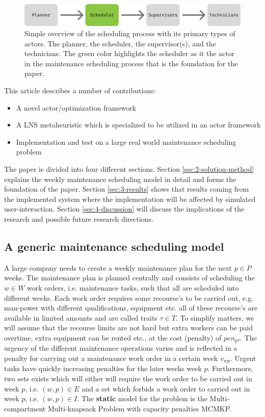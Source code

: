 \documentclass[preprint,12pt,authoryear]{elsarticle}
\begin{document}
\begin{figure}
\includegraphics[width=1.0\textwidth]{figures/Scheduling Process Simple.png}
\caption{Simple overview of the scheduling process with its primary types of actors. The planner, the scheduler, the supervisor(s), and the technicians. The green color highlights the scheduler as it the actor in the maintenance scheduling process that is the foundation for the paper.}
\label{fig:simple-maintenance-process}
\end{figure}

This article describes a number of contributions: 

\begin{itemize}
\item A novel actor/optimization framework
\item A LNS metaheuristic which is specialized to be utilized in an actor framework
\item Implementation and test on a large real world maintenance scheduling problem
\end{itemize}

The paper is divided into four different sections. Section \ref{sec:2-solution-method} explains the weekly maintenance scheduling model in detail and forms the foundation of the paper. Section \ref{sec:3-results} shows that results coming from the implemented system where the implementation will be affected by simulated user-interaction. Section \ref{sec:4-discussion} will discuss the implications of the research and possible future research directions.

\subsection{A generic maintenance scheduling model}
\label{sub2sec2}
A large company needs to create a weekly maintenance plan for the next $p \in P$ weeks. The maintenance plan is planned centrally and consists of scheduling the $w \in W$ work orders, i.e. maintenance tasks, such that all are scheduled into different weeks. Each work order requires some recourse's to be carried out, e.g. man-power with different qualifications, equipment etc. all of these recourse's are available in limited amounts and are called traits $\tau \in T$. To simplify matters, we will assume that the recourse limits are not hard but extra workers can be paid overtime, extra equipment can be rented etc., at the cost (penalty) of $pen_{p\tau}$. The urgency of the different maintenance operations varies and is reflected in a penalty for carrying out a maintenance work order in a certain week $v_{wp}$. Urgent tasks have quickly increasing penalties for the later weeks week $p$. Furthermore, two sets exists which will either will require the work order to be carried out in week $p$, i.e. $(w,p) \in E$ and a set which forbids a work order to carried out in week $p$, i.e. $(w,p) \in I$. The \textbf{static} model for the problem is the Multi-compartment Multi-knapsack Problem with capacity penalties MCMKP.
\end{document}
